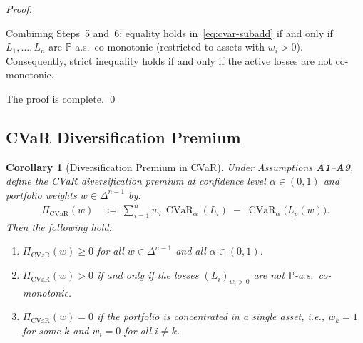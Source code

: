 \documentclass[12pt,openany]{book}
\newcommand{\Prob}{\mathbb{P}}
\newcommand{\bfw}{\mathbf{w}}
\DeclareMathOperator{\CVaR}{CVaR}
\numberwithin{equation}{chapter}
\theoremstyle{plain}
\newtheorem{corollary}[theorem]{Corollary}
\theoremstyle{definition}
\theoremstyle{remark}
\def\bfw{w}%
\begin{document}
\begin{proof}
\begin{enumerate}[label=\textbf{Step \arabic*.}, leftmargin=*,
                  widest=Step 6., itemsep=1ex]
        \medskip
        Combining Steps~5 and~6: equality holds in~\eqref{eq:cvar-subadd}
        if and only if $L_1,\ldots,L_n$ are $\Prob$-a.s.\ co-monotonic
        (restricted to assets with $w_i > 0$).  Consequently, strict
        inequality holds if and only if the active losses are not
        co-monotonic.

\end{enumerate}

\noindent The proof is complete.
\qed
\end{proof}

\subsection{CVaR Diversification Premium}

\begin{corollary}[Diversification Premium in CVaR]
\label{cor:cvar-premium}
Under Assumptions \textbf{A1}--\textbf{A9}, define the
\emph{CVaR diversification premium} at confidence level
$\alpha \in (0,1)$ and portfolio weights $\bfw \in \Delta^{n-1}$ by:
\begin{align}
  \Pi_{\mathrm{CVaR}}(\bfw)
  &\;\coloneqq\;
  \sum_{i=1}^n w_i\,\CVaR_\alpha(L_i)
  \;-\;
  \CVaR_\alpha\!\bigl(L_p(\bfw)\bigr).
  \label{eq:cvar-premium}
\end{align}
Then the following hold:
\begin{enumerate}[label=(\roman*)]
  \item $\Pi_{\mathrm{CVaR}}(\bfw) \geq 0$ for all
        $\bfw \in \Delta^{n-1}$ and all $\alpha \in (0,1)$.
  \item $\Pi_{\mathrm{CVaR}}(\bfw) > 0$ if and only if the
        losses $(L_i)_{w_i > 0}$ are not $\Prob$-a.s.\ co-monotonic.
  \item $\Pi_{\mathrm{CVaR}}(\bfw) = 0$ if the portfolio is
        concentrated in a single asset, i.e., $w_k = 1$ for some
        $k$ and $w_i = 0$ for all $i \neq k$.
\end{enumerate}
\end{corollary}
\end{document}
